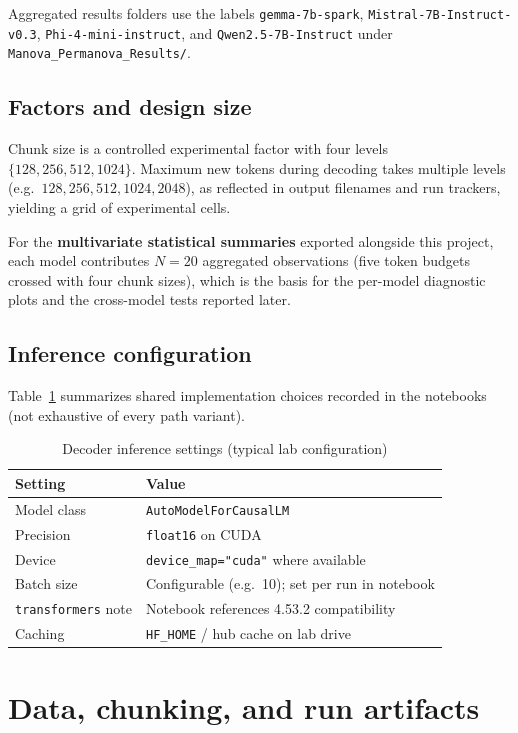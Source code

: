 \documentclass[11pt]{article}
\begin{document}
\noindent Aggregated results folders use the labels \texttt{gemma-7b-spark}, \texttt{Mistral-7B-Instruct-v0.3}, \texttt{Phi-4-mini-instruct}, and \texttt{Qwen2.5-7B-Instruct} under \texttt{Manova\_Permanova\_Results/}.

\subsection{Factors and design size}

Chunk size is a controlled experimental factor with four levels $\{128,256,512,1024\}$. Maximum new tokens during decoding takes multiple levels (e.g.\ $128,256,512,1024,2048$), as reflected in output filenames and run trackers, yielding a grid of experimental cells.

For the \textbf{multivariate statistical summaries} exported alongside this project, each model contributes $N=20$ aggregated observations (five token budgets crossed with four chunk sizes), which is the basis for the per-model diagnostic plots and the cross-model tests reported later.

\subsection{Inference configuration}

Table~\ref{tab:decoder-hyper} summarizes shared implementation choices recorded in the notebooks (not exhaustive of every path variant).

\begin{table}[H]
\centering
\caption{Decoder inference settings (typical lab configuration)}
\label{tab:decoder-hyper}
\begin{tabular}{ll}
\toprule
Setting & Value \\
\midrule
Model class & \texttt{AutoModelForCausalLM} \\
Precision & \texttt{float16} on CUDA \\
Device & \texttt{device\_map="cuda"} where available \\
Batch size & Configurable (e.g.\ 10); set per run in notebook \\
\texttt{transformers} note & Notebook references 4.53.2 compatibility \\
Caching & \texttt{HF\_HOME} / hub cache on lab drive \\
\bottomrule
\end{tabular}
\end{table}

\section{Data, chunking, and run artifacts}
\end{document}
